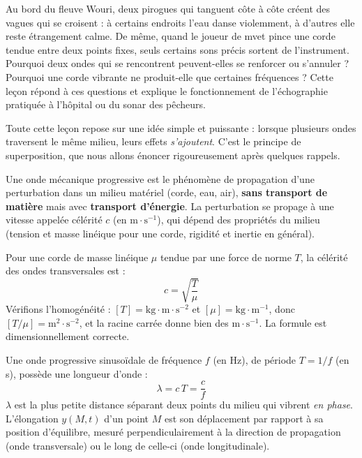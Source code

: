 \documentclass[11pt]{article}
\newcommand{\cle}[1]{{\popxbold\color{popdark}#1}}
\newcounter{popsec}
\newcounter{popsub}
\newcommand{\courssub}[1]{%
  \stepcounter{popsub}%
  \par\vspace{9pt}\noindent{\popxbold\fontsize{11.5}{13}\selectfont\color{popink}{\color{poporange}\thepopsec.\thepopsub}\hspace{6pt}#1}\par\nopagebreak\vspace{4pt}
}
\begin{document}
Au bord du fleuve Wouri, deux pirogues qui tanguent côte à côte créent des vagues qui se croisent : à certains endroits l'eau danse violemment, à d'autres elle reste étrangement calme. De même, quand le joueur de mvet pince une corde tendue entre deux points fixes, seuls certains sons précis sortent de l'instrument. Pourquoi deux ondes qui se rencontrent peuvent-elles se renforcer ou s'annuler ? Pourquoi une corde vibrante ne produit-elle que certaines fréquences ? Cette leçon répond à ces questions et explique le fonctionnement de l'échographie pratiquée à l'hôpital ou du sonar des pêcheurs.

Toute cette leçon repose sur une idée simple et puissante : lorsque plusieurs ondes traversent le même milieu, leurs effets \emph{s'ajoutent}. C'est le \cle{principe de superposition}, que nous allons énoncer rigoureusement après quelques rappels.

\courssub{Rappels : l'onde mécanique progressive}

\begin{definition}
Une \cle{onde mécanique progressive} est le phénomène de propagation d'une perturbation dans un milieu matériel (corde, eau, air), \textbf{sans transport de matière} mais avec \textbf{transport d'énergie}. La perturbation se propage à une vitesse appelée \cle{célérité} $c$ (en $\mathrm{m\cdot s^{-1}}$), qui dépend des propriétés du milieu (tension et masse linéique pour une corde, rigidité et inertie en général).
\end{definition}

Pour une corde de masse linéique $\mu$ tendue par une force de norme $T$, la célérité des ondes transversales est :
\[
c = \sqrt{\dfrac{T}{\mu}}
\]
Vérifions l'homogénéité : $[T] = \mathrm{kg\cdot m\cdot s^{-2}}$ et $[\mu] = \mathrm{kg\cdot m^{-1}}$, donc $[T/\mu] = \mathrm{m^2\cdot s^{-2}}$, et la racine carrée donne bien des $\mathrm{m\cdot s^{-1}}$. La formule est dimensionnellement correcte.

\begin{aretenir}
Une onde progressive sinusoïdale de fréquence $f$ (en Hz), de période $T = 1/f$ (en s), possède une \cle{longueur d'onde} :
\[
\lambda = c\,T = \dfrac{c}{f}
\]
$\lambda$ est la plus petite distance séparant deux points du milieu qui vibrent \emph{en phase}. L'\cle{élongation} $y(M,t)$ d'un point $M$ est son déplacement par rapport à sa position d'équilibre, mesuré perpendiculairement à la direction de propagation (onde transversale) ou le long de celle-ci (onde longitudinale).
\end{aretenir}
\end{document}
